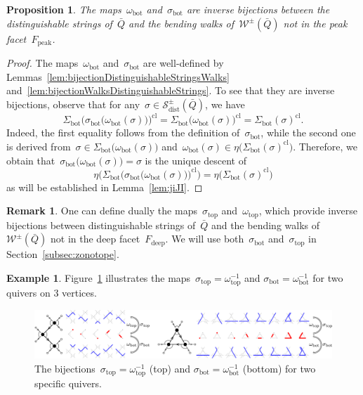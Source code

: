 \documentclass{amsart}
\newtheorem{proposition}[theorem]{Proposition}
\theoremstyle{definition}
\newtheorem{example}[theorem]{Example}
\newtheorem{remark}[theorem]{Remark}
\newcommand{\fref}[1]{Figure~\ref{#1}} %
\newcommand{\distinguishableStrings}{\mathcal{S}_\mathrm{dist}} %
\newcommand{\walks}{\mathcal{W}} %
\newcommand{\peak}{\mathrm{peak}} %
\newcommand{\deep}{\mathrm{deep}} %
\renewcommand{\top}{\mathrm{top}} %
\newcommand{\bottom}{\mathrm{bot}} %
\newcommand{\closure}[1]{#1^{\mathrm{cl}}} %
\begin{document}
\begin{proposition}
\label{prop:bijectionDistinguishableStringsWalks}
The maps~$\omega_\bottom$ and~$\sigma_\bottom$ are inverse bijections between the distinguishable strings of~$\bar Q$ and the bending walks of~$\walks^\pm(\bar Q)$ not in the peak facet~$F_\peak$.
\end{proposition}

\begin{proof}
The maps~$\omega_\bottom$ and~$\sigma_\bottom$ are well-defined by Lemmas~\ref{lem:bijectionDistinguishableStringsWalks} and~\ref{lem:bijectionWalksDistinguishableStrings}.
To see that they are inverse bijections, observe that for any~$\sigma \in \distinguishableStrings^\pm(\bar Q)$, we have\[
\closure{ \Sigma_\bottom \big( \sigma_\bottom \big( \omega_\bottom(\sigma) \big) \big)}
= \closure{\Sigma_\bottom \big( \omega_\bottom(\sigma) \big)}
= \closure{\Sigma_\bottom(\sigma)}.
\]
Indeed, the first equality follows from the definition of~$\sigma_\bottom$, while the second one is derived from~$\sigma \in \Sigma_\bottom \big( \omega_\bottom(\sigma) \big)$ and~$\omega_\bottom(\sigma) \in \eta \big( \closure{\Sigma_\bottom(\sigma)} \big)$.
Therefore, we obtain that~$\sigma_\bottom \big( \omega_\bottom(\sigma) \big) = \sigma$ is the unique descent of
\[
\eta \big( \closure{ \Sigma_\bottom \big( \sigma_\bottom \big( \omega_\bottom(\sigma) \big) \big)} \big) = \eta \big( \closure{\Sigma_\bottom(\sigma)} \big)
\]
as will be established in Lemma~\ref{lem:jiJI}.
\end{proof}

\begin{remark}
\label{rem:bijectionDistinguishableStringsWalks}
One can define dually the maps~$\sigma_\top$ and~$\omega_\top$, which provide inverse bijections between distinguishable strings of~$\bar Q$ and the bending walks of~$\walks^\pm(\bar Q)$ not in the deep facet~$F_\deep$.
We will use both~$\sigma_\bottom$ and~$\sigma_\top$ in Section~\ref{subsec:zonotope}.
\end{remark}

\begin{example}
\fref{fig:exmBijectionStringsWalks2} illustrates the maps~$\sigma_\top = \omega_\top^{-1}$ and $\sigma_\bottom = \omega_\bottom^{-1}$ for two quivers on $3$ vertices.

\begin{figure}[t]
	\capstart
	\centerline{\includegraphics[scale=.4]{exmBijectionStringsWalks2}}
	\caption{The bijections~$\sigma_\top = \omega_\top^{-1}$ (top) and $\sigma_\bottom = \omega_\bottom^{-1}$ (bottom) for two specific quivers.}
	\label{fig:exmBijectionStringsWalks2}
\end{figure}
\end{example}
\end{document}
